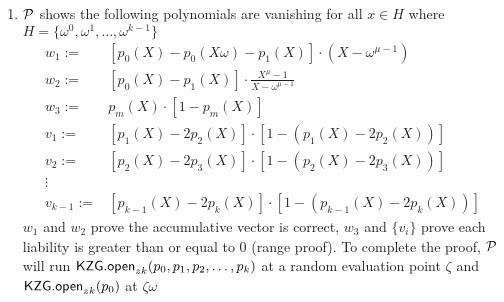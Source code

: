 \begin{Protocol*}[t!]
\begin{framed}
\begin{enumerate}
	
        \item $\mathcal{P}$ shows the following polynomials are vanishing for all $x\in{H}$ where $H=\{\omega^0,\omega^1,\dots,\omega^{k-1}\}$
        \begin{align*}
            w_1:=&[p_0(X)-p_0(X\omega)-p_1(X)]\cdot(X-\omega^{\mu-1}) \\
            w_2:=&[p_0(X)-p_1(X)]\cdot\frac{X^\mu-1}{X-\omega^{\mu-1}} \\
            w_3:=&p_m(X)\cdot[1-p_m(X)] \\
            v_1:=&[p_1(X)-2p_2(X)]\cdot[1-(p_1(X)-2p_2(X))] \\
            v_2:=&[p_2(X)-2p_3(X)]\cdot[1-(p_2(X)-2p_3(X))] \\
            \vdots \\
            v_{k-1}:=&[p_{k-1}(X)-2p_k(X)]\cdot[1-(p_{k-1}(X)-2p_k(X))]
        \end{align*}
        $w_1$ and $w_2$ prove the accumulative vector is correct, $w_3$ and $\{v_i\}$ prove each liability is greater than or equal to 0 (range proof). To complete the proof, $\mathcal{P}$ will run $\mathsf{KZG.open}_{zk}(p_0,p_1,p_2,\dots,p_k)$ at a random evaluation point $\zeta$ and $\mathsf{KZG.open}_{zk}(p_0)$ at $\zeta\omega$

\end{enumerate}
\end{framed}
\end{Protocol*}
